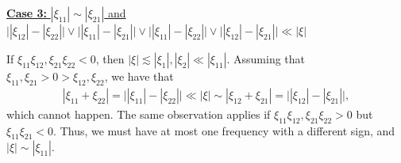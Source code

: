 \documentclass[%
11pt,  reqno]{amsart}
\newcommand{\5}{\textup{V}}
\newcommand{\noi}{\noindent}
\newcommand{\les}{\lesssim}
\theoremstyle{remark}
\numberwithin{equation}{section}
\numberwithin{theorem}{section}
\begin{document}
\smallskip
\noi
\underline{\textbf{Case 3:} $|\xi_{11}| \sim |\xi_{21}|$ and $\big| |\xi_{12}| - |\xi_{22}| \big| \lor \big| |\xi_{11}| - |\xi_{21}| \big| \lor \big| |\xi_{11}| - |\xi_{22}| \big| \lor \big| |\xi_{12}| - |\xi_{21}| \big|\ll |\xi| $}


If $\xi_{11} \xi_{12}, \xi_{21}\xi_{22}<0$, then $|\xi| \les |\xi_1|, |\xi_2|\ll |\xi_{11}|$. Assuming that $\xi_{11},\xi_{21}>0 > \xi_{12}, \xi_{22} $, we have that
\begin{align}
    |\xi_{11} + \xi_{22} | = \big| |\xi_{11}| - |\xi_{22}| \big| 
    \ll |\xi| \sim |\xi_{12} + \xi_{21}| = \big| |\xi_{12}| - |\xi_{21}| \big|, 
\end{align}
which cannot happen.
The same observation applies if $\xi_{11}\xi_{12}, \xi_{21}\xi_{22}>0$ but $\xi_{11}\xi_{21}<0$. 
Thus, we must have at most one frequency with a different sign, and $|\xi| \sim |\xi_{11}|$. 
\end{document}
